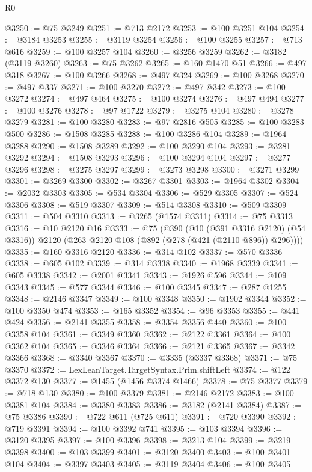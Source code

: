\begin{lexlean}{R0}
\begin{coremodule}
@3250 := @75 @3249
@3251 := @713 @2172
@3253 := @100 @3251 @104
@3254 := @3184 @3253
@3255 := @3119 @3254
@3256 := @100 @3255
@3257 := @713 @616
@3259 := @100 @3257 @104
@3260 := @3256 @3259
@3262 := @3182 (@3119 @3260)
@3263 := @75 @3262
@3265 := @160 @1470 @51
@3266 := @497 @318
@3267 := @100 @3266
@3268 := @497 @324
@3269 := @100 @3268
@3270 := @497 @337
@3271 := @100 @3270
@3272 := @497 @342
@3273 := @100 @3272
@3274 := @497 @464
@3275 := @100 @3274
@3276 := @497 @494
@3277 := @100 @3276
@3278 := @97 @1722
@3279 := @3275 @104
@3280 := @3278 @3279
@3281 := @100 @3280
@3283 := @97 @2816 @505
@3285 := @100 @3283 @500
@3286 := @1508 @3285
@3288 := @100 @3286 @104
@3289 := @1964 @3288
@3290 := @1508 @3289
@3292 := @100 @3290 @104
@3293 := @3281 @3292
@3294 := @1508 @3293
@3296 := @100 @3294 @104
@3297 := @3277 @3296
@3298 := @3275 @3297
@3299 := @3273 @3298
@3300 := @3271 @3299
@3301 := @3269 @3300
@3302 := @3267 @3301
@3303 := @1964 @3302
@3304 := @2032 @3303
@3305 := @534 @3304
@3306 := @529 @3305
@3307 := @524 @3306
@3308 := @519 @3307
@3309 := @514 @3308
@3310 := @509 @3309
@3311 := @504 @3310
@3313 := @3265 (@1574 @3311)
@3314 := @75 @3313
@3316 := @10 @2120 @16
@3333 := @75
    (@390
      (@10 (@391 @3316 @2120) (@54 @3316))
      @2120
      (@263 @2120 @108 (@892 (@278 (@421 (@2110 @896)) @296))))
@3335 := @160 @3316 @2120
@3336 := @314 @102
@3337 := @570 @3336
@3338 := @605 @102
@3339 := @314 @3338
@3340 := @1968 @3339
@3341 := @605 @3338
@3342 := @2001 @3341
@3343 := @1926 @596
@3344 := @109 @3343
@3345 := @577 @3344
@3346 := @100 @3345
@3347 := @287 @1255
@3348 := @2146 @3347
@3349 := @100 @3348
@3350 := @1902 @3344
@3352 := @100 @3350 @474
@3353 := @165 @3352
@3354 := @96 @3353
@3355 := @441 @424
@3356 := @2141 @3355
@3358 := @3354 @3356 @440
@3360 := @100 @3358 @104
@3361 := @3349 @3360
@3362 := @2122 @3361
@3364 := @100 @3362 @104
@3365 := @3346 @3364
@3366 := @2121 @3365
@3367 := @3342 @3366
@3368 := @3340 @3367
@3370 := @3335 (@3337 @3368)
@3371 := @75 @3370
@3372 := LexLeanTarget.TargetSyntax.Prim.shiftLeft
@3374 := @122 @3372 @130
@3377 := @1455 (@1456 @3374 @1466)
@3378 := @75 @3377
@3379 := @718 @130
@3380 := @100 @3379
@3381 := @2146 @2172
@3383 := @100 @3381 @104
@3384 := @3380 @3383
@3386 := @3182 (@2141 @3384)
@3387 := @75 @3386
@3390 := @722 @611 (@725 @611)
@3391 := @720 @3390
@3392 := @719 @3391
@3394 := @100 @3392 @741
@3395 := @103 @3394
@3396 := @3120 @3395
@3397 := @100 @3396
@3398 := @3213 @104
@3399 := @3219 @3398
@3400 := @103 @3399
@3401 := @3120 @3400
@3403 := @100 @3401 @104
@3404 := @3397 @3403
@3405 := @3119 @3404
@3406 := @100 @3405

\end{coremodule}
\end{lexlean}
